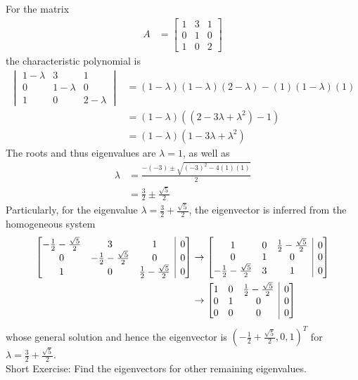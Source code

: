 \begin{exmp}
For the matrix
\begin{align*}
A &= 
\begin{bmatrix}
1 & 3 & 1 \\
0 & 1 & 0 \\
1 & 0 & 2
\end{bmatrix}
\end{align*}
the characteristic polynomial is
\begin{align*}
\begin{vmatrix}
1-\lambda & 3 & 1 \\
0 & 1-\lambda & 0 \\
1 & 0 & 2-\lambda 
\end{vmatrix} &=
(1-\lambda)(1-\lambda)(2-\lambda) - (1)(1-\lambda)(1) \\
&= (1-\lambda)((2-3\lambda+\lambda^2) - 1) \\
&= (1-\lambda)(1-3\lambda+\lambda^2)
\end{align*}
The roots and thus eigenvalues are $\lambda = 1$, as well as
\begin{align*}
\lambda &= \frac{-(-3) \pm \sqrt{(-3)^2 - 4(1)(1)}}{2} \\
&= \frac{3}{2} \pm \frac{\sqrt{5}}{2}
\end{align*}
Particularly, for the eigenvalue $\lambda = \frac{3}{2} + \frac{\sqrt{5}}{2}$, the eigenvector is inferred from the homogeneous system
\begin{align*}
\left[\begin{array}{@{}ccc|c@{}}
-\frac{1}{2}-\frac{\sqrt{5}}{2} & 3 & 1 & 0 \\
0 & -\frac{1}{2}-\frac{\sqrt{5}}{2} & 0 & 0 \\
1 & 0 & \frac{1}{2}-\frac{\sqrt{5}}{2} & 0
\end{array}\right] &\to
\left[\begin{array}{@{}ccc|c@{}}
1 & 0 & \frac{1}{2}-\frac{\sqrt{5}}{2} & 0 \\
0 & 1 & 0 & 0 \\
-\frac{1}{2}-\frac{\sqrt{5}}{2} & 3 & 1 & 0
\end{array}\right]  \\
&\to
\left[\begin{array}{@{}ccc|c@{}}
1 & 0 & \frac{1}{2}-\frac{\sqrt{5}}{2} & 0 \\
0 & 1 & 0 & 0 \\
0 & 0 & 0 & 0
\end{array}\right]
\end{align*}
whose general solution and hence the eigenvector is $(-\frac{1}{2}+\frac{\sqrt{5}}{2},0,1)^T$ for $\lambda = \frac{3}{2} + \frac{\sqrt{5}}{2}$.\\
Short Exercise: Find the eigenvectors for other remaining eigenvalues.
\end{exmp}

